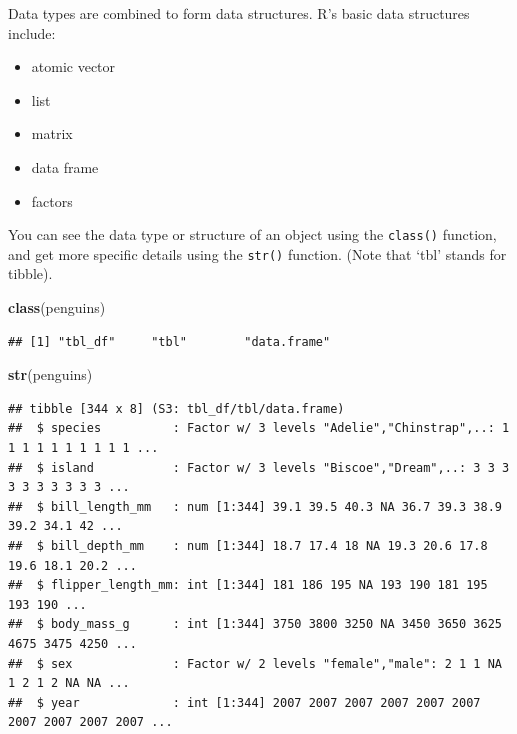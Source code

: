 \documentclass[
]{book}
\newenvironment{Shaded}{\begin{snugshade}}{\end{snugshade}}
\newcommand{\FunctionTok}[1]{\textcolor[rgb]{0.13,0.29,0.53}{\textbf{#1}}}
\newcommand{\NormalTok}[1]{#1}
\newcommand{\SpecialCharTok}[1]{\textcolor[rgb]{0.81,0.36,0.00}{\textbf{#1}}}
\begin{document}
Data types are combined to form data structures. R's basic data structures include:

\begin{itemize}
\item
  atomic vector
\item
  list
\item
  matrix
\item
  data frame
\item
  factors
\end{itemize}

You can see the data type or structure of an object using the \texttt{class()} function, and get more specific details using the \texttt{str()} function. (Note that `tbl' stands for tibble).

\begin{Shaded}
\begin{Highlighting}[]
\FunctionTok{class}\NormalTok{(penguins)}
\end{Highlighting}
\end{Shaded}

\begin{verbatim}
## [1] "tbl_df"     "tbl"        "data.frame"
\end{verbatim}

\begin{Shaded}
\begin{Highlighting}[]
\FunctionTok{str}\NormalTok{(penguins)}
\end{Highlighting}
\end{Shaded}

\begin{verbatim}
## tibble [344 x 8] (S3: tbl_df/tbl/data.frame)
##  $ species          : Factor w/ 3 levels "Adelie","Chinstrap",..: 1 1 1 1 1 1 1 1 1 1 ...
##  $ island           : Factor w/ 3 levels "Biscoe","Dream",..: 3 3 3 3 3 3 3 3 3 3 ...
##  $ bill_length_mm   : num [1:344] 39.1 39.5 40.3 NA 36.7 39.3 38.9 39.2 34.1 42 ...
##  $ bill_depth_mm    : num [1:344] 18.7 17.4 18 NA 19.3 20.6 17.8 19.6 18.1 20.2 ...
##  $ flipper_length_mm: int [1:344] 181 186 195 NA 193 190 181 195 193 190 ...
##  $ body_mass_g      : int [1:344] 3750 3800 3250 NA 3450 3650 3625 4675 3475 4250 ...
##  $ sex              : Factor w/ 2 levels "female","male": 2 1 1 NA 1 2 1 2 NA NA ...
##  $ year             : int [1:344] 2007 2007 2007 2007 2007 2007 2007 2007 2007 2007 ...
\end{verbatim}

\begin{Shaded}
\end{Shaded}
\end{document}
